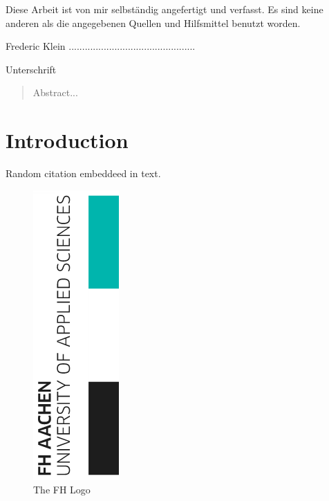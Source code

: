 
%



	
\restoregeometry


\clearpage
\vspace*{\fill}
\begin{center}
	\begin{minipage}{.8\textwidth}
		\thispagestyle{empty} %
		Diese Arbeit ist von mir selbst\"andig angefertigt und verfasst. Es sind keine anderen als die angegebenen Quellen und Hilfsmittel benutzt worden.\par
		\vspace{1cm}
		Frederic Klein ...............................................\par
		Unterschrift
	\end{minipage}
\end{center}
\vfill %
\clearpage


\begin{abstract}
	\thispagestyle{plain}
	\setcounter{page}{1}
	Abstract...
\end{abstract}

\tableofcontents
\setcounter{page}{2}
\listoffigures

\chapter{Introduction}

\lipsum[1]
Random citation \cite{DUMMY:1} embeddeed in text.\par
\lipsum[2]
\begin{figure}
	\caption{The FH Logo}
	\includegraphics[scale=0.5]{figures/FH-logo.png}
\end{figure}

